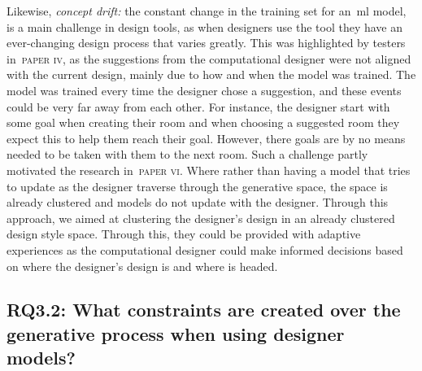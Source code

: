 Likewise, \emph{concept drift:} the constant change in the training set for an~\acrshort{ml} model, is a main challenge in design tools, as when designers use the tool they have an ever-changing design process that varies greatly. This was highlighted by testers in~\textsc{paper iv}, as the suggestions from the computational designer were not aligned with the current design, mainly due to how and when the model was trained. The model was trained every time the designer chose a suggestion, and these events could be very far away from each other. For instance, the designer start with some goal when creating their room and when choosing a suggested room they expect this to help them reach their goal. However, there goals are by no means needed to be taken with them to the next room. Such a challenge partly motivated the research in~\textsc{paper vi}. Where rather than having a model that tries to update as the designer traverse through the generative space, the space is already clustered and models do not update with the designer. Through this approach, we aimed at clustering the designer's design in an already clustered design style space. Through this, they could be provided with adaptive experiences as the computational designer could make informed decisions based on where the designer's design is and where is headed. 





\subsection[Research Question 3.2]{RQ3.2: What constraints are created over the generative process when using designer models?}

